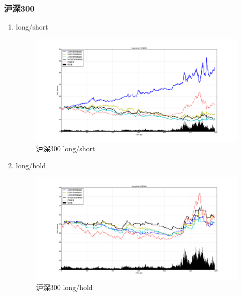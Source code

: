 \documentclass[12pt,a4paper]{article}
\begin{document}
\subsubsection{沪深300}
\begin{enumerate}
\item long/short 
\begin{figure}[H]
	\centering
	\includegraphics[width=1.0\textwidth]{img_r_5/hs300.png}
	\caption{沪深300 long/short }
\end{figure}
\item long/hold 
\begin{figure}[H]
	\centering
	\includegraphics[width=1.0\textwidth]{img_r_5/hs300_1.png}
	\caption{沪深300 long/hold }
\end{figure}
\end{enumerate}
\end{document}
